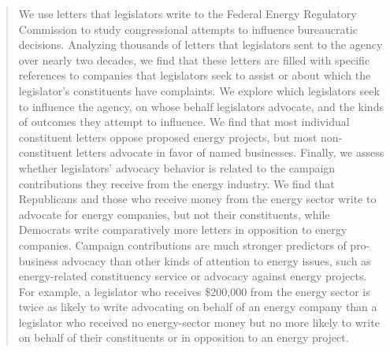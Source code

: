 \documentclass{article}
\begin{document}
\maketitle

% 

\begin{abstract}
\noindent 

We use letters that legislators write to the Federal Energy Regulatory Commission to study congressional attempts to influence bureaucratic decisions. Analyzing thousands of letters that legislators sent to the agency over nearly two decades, we find that these letters are filled with specific references to companies that legislators seek to assist or about which the legislator's constituents have complaints.  We explore which legislators seek to influence the agency, on whose behalf legislators advocate, and the kinds of outcomes they attempt to influence. We find that most individual constituent letters oppose proposed energy projects, but most non-constituent letters advocate in favor of named businesses. Finally, we assess whether legislators' advocacy behavior is related to the campaign contributions they receive from the energy industry.  We find that Republicans and those who receive money from the energy sector write to advocate for energy companies, but not their constituents, while Democrats write comparatively more letters in opposition to energy companies. Campaign contributions are much stronger predictors of pro-business advocacy than other kinds of attention to energy issues, such as energy-related constituency service or advocacy against energy projects. %
For example, a legislator who receives \$200,000 from the energy sector is twice as likely to write advocating on behalf of an energy company than a legislator who received no energy-sector money but no more likely to write on behalf of their constituents or in opposition to an energy project. 

\end{abstract}
\end{document}
